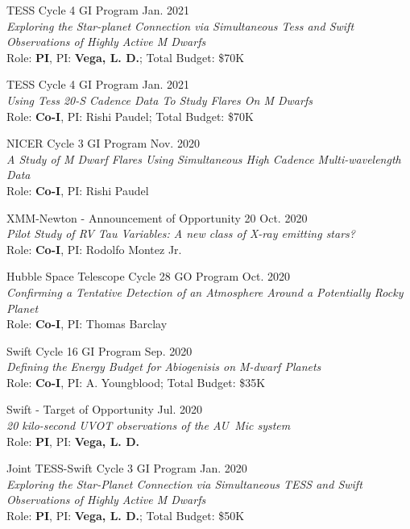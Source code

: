 \documentclass[12pt]{article}
\begin{document}
\begin{etaremune}
\item TESS Cycle 4 GI Program \hfill Jan. 2021 \\
\textit{Exploring the Star-planet Connection via Simultaneous Tess and Swift Observations of Highly Active M Dwarfs} \\ Role: \textbf{PI}, PI: \textbf{Vega, L. D.}; Total Budget: \$70K

\item TESS Cycle 4 GI Program \hfill Jan. 2021 \\
\textit{Using Tess 20-S Cadence Data To Study Flares On M Dwarfs} \\ Role: \textbf{Co-I}, PI: Rishi Paudel; Total Budget: \$70K

\item NICER Cycle 3 GI Program \hfill Nov. 2020 \\
\textit{A Study of M Dwarf Flares Using Simultaneous High Cadence Multi-wavelength Data} \\ Role: \textbf{Co-I}, PI: Rishi Paudel

\item XMM-Newton - Announcement of Opportunity 20 \hfill Oct. 2020 \\
\textit{Pilot Study of RV Tau Variables: A new class of X-ray emitting stars?} \\ Role: \textbf{Co-I}, PI: Rodolfo Montez Jr.

\item Hubble Space Telescope Cycle 28 GO Program \hfill Oct. 2020 \\
\textit{Confirming a Tentative Detection of an Atmosphere Around a Potentially Rocky Planet} \\ Role: \textbf{Co-I}, PI: Thomas Barclay

\item Swift Cycle 16 GI Program  \hfill Sep. 2020 \\
\textit{Defining the Energy Budget for Abiogenisis on M-dwarf Planets} \\ Role: \textbf{Co-I}, PI: A. Youngblood; Total Budget: \$35K

\item Swift - Target of Opportunity \hfill Jul. 2020 \\
\textit{20 kilo-second UVOT observations of the AU~Mic system} \\ Role: \textbf{PI}, PI: \textbf{Vega, L. D.}

\item Joint TESS-Swift Cycle 3 GI Program  \hfill Jan. 2020 \\
\textit{Exploring the Star-Planet Connection via Simultaneous TESS and Swift Observations of Highly Active M Dwarfs} \\ Role: \textbf{PI}, PI: \textbf{Vega, L. D.}; Total Budget: \$50K 


\end{etaremune}
\end{document}
